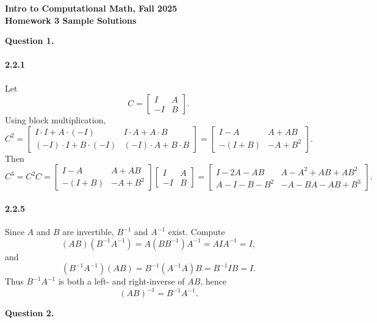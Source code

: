 \documentclass[11pt]{article}
\begin{document}
\begin{center}
{\bf Intro to Computational Math, Fall 2025\\
Homework 3 Sample Solutions}
\end{center}

{\bf Question 1.}

\paragraph{2.2.1}
Let
\[
C=\begin{bmatrix} I & A \\ -I & B \end{bmatrix}.
\]
Using block multiplication,
\[
C^{2}=
\begin{bmatrix}
I\cdot I+A\cdot(-I) & I\cdot A+A\cdot B \\
(-I)\cdot I+B\cdot(-I) & (-I)\cdot A+B\cdot B
\end{bmatrix}
=
\begin{bmatrix}
I-A & A+AB \\
-(I+B) & -A+B^{2}
\end{bmatrix}.
\]
Then
\[
C^{3}=C^{2}C=
\begin{bmatrix}
I-A & A+AB \\
-(I+B) & -A+B^{2}
\end{bmatrix}
\begin{bmatrix}
I & A \\
-I & B
\end{bmatrix}
=
\begin{bmatrix}
I-2A-AB & A-A^{2}+AB+AB^{2} \\
A-I-B-B^{2} & -A-BA-AB+B^{3}
\end{bmatrix}.
\]

\paragraph{2.2.5}
Since $A$ and $B$ are invertible, $B^{-1}$ and $A^{-1}$ exist. Compute
\[
(AB)(B^{-1}A^{-1})=A(BB^{-1})A^{-1}=AIA^{-1}=I,
\]
and
\[
(B^{-1}A^{-1})(AB)=B^{-1}(A^{-1}A)B=B^{-1}IB=I.
\]
Thus $B^{-1}A^{-1}$ is both a left- and right-inverse of $AB$, hence
\[
(AB)^{-1}=B^{-1}A^{-1}.
\]


\newpage



{\bf Question 2.}
\end{document}

